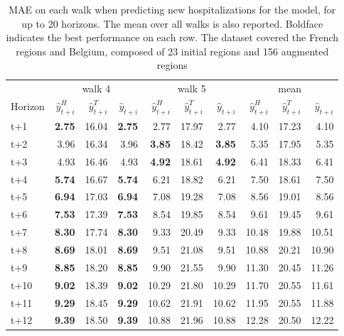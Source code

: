 \begin{table}[H]
\centering
\caption{MAE on each walk when predicting new hospitalizations for the model, for up to 20 horizons. The mean over all walks is also reported. Boldface indicates the best performance on each row. The dataset covered the French regions and Belgium, composed of 23 initial regions and 156 augmented regions }
\label{tab:MAE_walk_assemble}
\begin{tabular}{lrrrrrrrrr}
\toprule
 & \multicolumn{3}{c}{walk 4} & \multicolumn{3}{c}{walk 5} & \multicolumn{3}{c}{mean} 
\\

\cmidrule(lr){2-4} \cmidrule(lr){5-7} \cmidrule(lr){8-10} 
Horizon & $\hat{y}_{t+i}^H$ & $\hat{y}_{t+i}^T$ & $\hat{y}_{t+i}$ & $\hat{y}_{t+i}^H$ & $\hat{y}_{t+i}^T$ & $\hat{y}_{t+i}$ & $\hat{y}_{t+i}^H$ & $\hat{y}_{t+i}^T$ & $\hat{y}_{t+i}$ \\
\midrule
t+1  & \textbf{2.75}  & 16.04  & \textbf{2.75}  & 2.77  & 17.97  & 2.77  & 4.10  & 17.23  & 4.10  \\
t+2  & 3.96  & 16.34  & 3.96  & \textbf{3.85}  & 18.42  & \textbf{3.85}  & 5.35  & 17.95  & 5.35  \\
t+3  & 4.93  & 16.46  & 4.93  & \textbf{4.92}  & 18.61  & \textbf{4.92}  & 6.41  & 18.33  & 6.41  \\
t+4  & \textbf{5.74}  & 16.67  & \textbf{5.74}  & 6.21  & 18.82  & 6.21  & 7.50  & 18.61  & 7.50  \\
t+5  & \textbf{6.94}  & 17.03  & \textbf{6.94}  & 7.08  & 19.28  & 7.08  & 8.56  & 19.01  & 8.56  \\
t+6  & \textbf{7.53}  & 17.39  & \textbf{7.53}  & 8.54  & 19.85  & 8.54  & 9.61  & 19.45  & 9.61  \\
t+7  & \textbf{8.30}  & 17.74  & \textbf{8.30}  & 9.33  & 20.49  & 9.33  & 10.48  & 19.88  & 10.51  \\
t+8  & \textbf{8.69}  & 18.01  & \textbf{8.69}  & 9.51  & 21.08  & 9.51  & 10.88  & 20.21  & 10.90  \\
t+9  & \textbf{8.85}  & 18.20  & \textbf{8.85}  & 9.90  & 21.55  & 9.90  & 11.30  & 20.45  & 11.26  \\
t+10  & \textbf{9.02}  & 18.39  & \textbf{9.02}  & 10.29  & 21.80  & 10.29  & 11.70  & 20.55  & 11.61  \\
t+11  & \textbf{9.29}  & 18.45  & \textbf{9.29}  & 10.62  & 21.91  & 10.62  & 11.95  & 20.55  & 11.88  \\
t+12  & \textbf{9.39}  & 18.50  & \textbf{9.39}  & 10.88  & 21.96  & 10.88  & 12.28  & 20.50  & 12.22  \\

\end{tabular}
\end{table}

